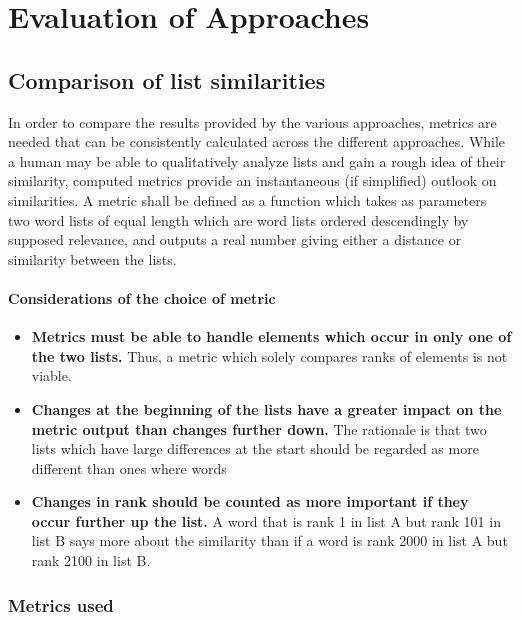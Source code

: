 \section{Evaluation of Approaches}
\subsection{Comparison of list similarities}
In order to compare the results provided by the various approaches, metrics are needed that can be consistently calculated across the different approaches.
While a human may be able to qualitatively analyze lists and gain a rough idea of their similarity, computed metrics provide an instantaneous (if simplified) outlook on similarities.
A metric shall be defined as a function which takes as parameters two word lists of equal length which are word lists ordered descendingly by supposed relevance, and outputs a real number giving either a distance or similarity between the lists.

\paragraph{Considerations of the choice of metric}
\begin{itemize}
	\item  \textbf{Metrics must be able to handle elements which occur in only one of the two lists.}
	      Thus, a metric which solely compares ranks of elements is not viable.
	\item  \textbf{Changes at the beginning of the lists have a greater impact on the metric output than changes further down.}
	      The rationale is that two lists which have large differences at the start should be regarded as more different than ones where words
	\item  \textbf{Changes in rank should be counted as more important if they occur further up the list.}
	      A word that is rank 1 in list A but rank 101 in list B says more about the similarity than if a word is rank 2000 in list A but rank 2100 in list B.
\end{itemize}

\subsubsection{Metrics used}

